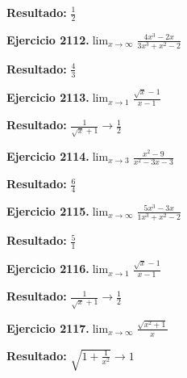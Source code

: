 \documentclass[10pt,a4paper]{article}
\begin{document}
\begin{solbox}
\textbf{Resultado:} \(\displaystyle \frac{1}{2}\)
\end{solbox}

\begin{ejbox}
\textbf{Ejercicio 2112.}\quad $\lim_{x\to \infty} \frac{4x^3 - 2x}{3x^3 + x^2 - 2}$
\end{ejbox}

\begin{solbox}
\textbf{Resultado:} \(\displaystyle \frac{4}{3}\)
\end{solbox}

\begin{ejbox}
\textbf{Ejercicio 2113.}\quad $\lim_{x\to 1} \frac{\sqrt{x}-1}{x-1}$
\end{ejbox}

\begin{solbox}
\textbf{Resultado:} \(\displaystyle \frac{1}{\sqrt{x}+1} \to \frac{1}{2}\)
\end{solbox}

\newpage
\begin{ejbox}
\textbf{Ejercicio 2114.}\quad $\lim_{x\to 3} \frac{x^2-9}{x^2-3x-3}$
\end{ejbox}

\begin{solbox}
\textbf{Resultado:} \(\displaystyle \frac{6}{4}\)
\end{solbox}

\begin{ejbox}
\textbf{Ejercicio 2115.}\quad $\lim_{x\to \infty} \frac{5x^3 - 3x}{1x^3 + x^2 - 2}$
\end{ejbox}

\begin{solbox}
\textbf{Resultado:} \(\displaystyle \frac{5}{1}\)
\end{solbox}

\begin{ejbox}
\textbf{Ejercicio 2116.}\quad $\lim_{x\to 1} \frac{\sqrt{x}-1}{x-1}$
\end{ejbox}

\begin{solbox}
\textbf{Resultado:} \(\displaystyle \frac{1}{\sqrt{x}+1} \to \frac{1}{2}\)
\end{solbox}

\newpage
\begin{ejbox}
\textbf{Ejercicio 2117.}\quad $\lim_{x\to \infty} \frac{\sqrt{x^2+1}}{x}$
\end{ejbox}

\begin{solbox}
\textbf{Resultado:} \(\displaystyle \sqrt{1+\frac{1}{x^2}} \to 1\)
\end{solbox}
\end{document}
